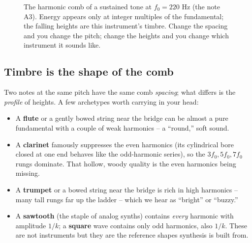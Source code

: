 \begin{figure}[H]
\centering
{}
\caption{The harmonic comb of a sustained tone at $f_0 = 220$ Hz (the note A3). Energy appears only
at integer multiples of the fundamental; the falling heights are this instrument's timbre. Change the
spacing and you change the pitch; change the heights and you change which instrument it sounds like.}
\label{ch29:fig-comb}
\end{figure}

\subsection*{Timbre is the shape of the comb}

Two notes at the same pitch have the same comb \emph{spacing}; what differs is the \emph{profile} of
heights. A few archetypes worth carrying in your head:

\begin{itemize}
  \item A \textbf{flute} or a gently bowed string near the bridge can be almost a pure fundamental
    with a couple of weak harmonics -- a ``round,'' soft sound.
  \item A \textbf{clarinet} famously suppresses the even harmonics (its cylindrical bore closed at one
    end behaves like the odd-harmonic series), so the $3f_0, 5f_0, 7f_0$ rungs dominate. That hollow,
    woody quality is the even harmonics being missing.
  \item A \textbf{trumpet} or a bowed string near the bridge is rich in high harmonics -- many tall
    rungs far up the ladder -- which we hear as ``bright'' or ``buzzy.''
  \item A \textbf{sawtooth} (the staple of analog synths) contains \emph{every} harmonic with
    amplitude $1/k$; a \textbf{square} wave contains only odd harmonics, also $1/k$. These are not
    instruments but they are the reference shapes synthesis is built from.
\end{itemize}

